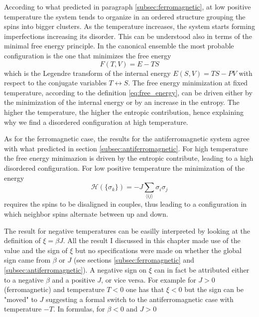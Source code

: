 According to what predicted in paragraph \ref{subsec:ferromagnetic}, at low positive temperature the system tends to organize
in an ordered structure grouping the spins into bigger clusters. As the temperature increases, the system starts forming imperfections increasing its disorder. This can be understood 
also in terms of the minimal free energy principle. In the canonical ensemble the most probable configuration is the one that minimizes the free energy
\begin{equation}
    F(T, V) = E - TS
    \label{eq:free_energy}
\end{equation}
which is the Legendre transform of the internal energy $E(S, V) = TS - PV$ with respect to the conjugate variables $T \leftrightarrow S$. The free energy minimization at fixed temperature, according to the definition \ref{eq:free_energy},
can be driven either by the minimization of the internal energy or by an increase in the entropy. The higher the temperature, the higher the entropic contribution, hence explaining why 
we find a disordered configuration at high temperature. \par
\vspace{10pt}
As for the ferromagnetic case, the results for the antiferromagnetic system agree with what predicted in section \ref{subsec:antiferromagnetic}. For high temperature the free energy minimazion is driven by the entropic contribute, leading to a high disordered configuration. 
For low positive temperature the minimization of the energy 
\begin{equation*}
    \mathcal{H}(\{\sigma_k\}) = -J \sum_{\langle i j\rangle}\sigma_{i} \sigma_{j}
\end{equation*}
requires the spins to be disaligned in couples, thus leading to a configuration in which neighbor spins alternate between up and down. \par
\vspace{10pt}
The result for negative temperatures can be easilly interpreted by looking at the definition of $\xi = \beta J$. All the result I discussed in this chapter made use of the value and the sign of $\xi$ but no specifications were made on whether the global sign came from $\beta$ or $J$ (see sections \ref{subsec:ferromagnetic} and \ref{subsec:antiferromagnetic}). A negative sign on $\xi$ can in fact be attributed either to 
a negative $\beta$ and a positive $J$, or vice versa. For example for $J>0$ (ferromagnetic) and temperature $T<0$ one has that $\xi < 0$ but the sign can be "moved" to $J$ suggesting a formal switch to the antiferromagnetic case with temperature $-T$. In formulas, for $\beta < 0$ and $J > 0$
